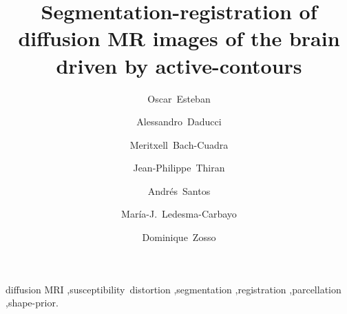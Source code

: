 \documentclass[5p,numbers,sort&compress]{elsarticle}
\begin{document}
\begin{frontmatter}


\title{Segmentation-registration of diffusion MR images of the brain driven
by active-contours}

\author[bit]{Oscar~Esteban}
\author[lts5]{Alessandro~Daducci}
\author[chuv,lts5]{Meritxell~Bach-Cuadra}
\author[lts5]{Jean-Philippe~Thiran}
\author[bit]{Andr\'es~Santos}
\author[bit]{Mar\'ia-J.~Ledesma-Carbayo}
\author[ucla]{Dominique~Zosso}


\address[bit]{Biomedical Image Technologies (BIT), ETSI Telecomunicaci\'on, %
Universidad Polit\'ecnica de Madrid and CIBER-BBN, Madrid, Spain}
\address[lts5]{Signal Processing Laboratory (LTS5), \'Ecole Polytechnique
F\'ed\'erale de Lausanne (EPFL), Lausanne, Switzerland}
\address[chuv]{Dept. of Radiology, University
Hospital Center (CHUV) and University of Lausanne (UNIL), Lausanne, Switzerland}
\address[ucla]{Department of Mathematics, University of California,
Los Angeles (UCLA), Los Angeles, CA, US}

\begin{abstract}

\end{abstract}

\begin{keyword}
diffusion MRI \sep susceptibility~distortion \sep segmentation %
\sep registration \sep parcellation \sep shape-prior.
\end{keyword}

\end{frontmatter}



%






\appendix






\end{document}
